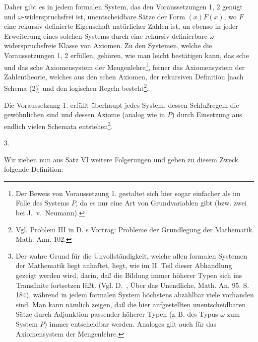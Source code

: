 \documentclass[draft]{scrartcl}
\begin{document}
Daher gibt es in jedem formalen System, das den Voraussetzungen 1, 2 genügt
und $\omega$-widerspruchsfrei ist, unentscheidbare Sätze der Form
$\left(x\right)F\left(x\right)$, wo $F$ eine rekursiv definierte Eigenschaft
natürlicher Zahlen ist, un ebenso in jeder Erweiterung eines solchen Systems
durch eine rekursiv definierbare $\omega$-widerspruchsfreie Klasse von Axiomen.
Zu den Systemen, welche die Voraussetzungen 1, 2 erfüllen, gehören, wie man leicht
bestätigen kann, das sche und das sche Axiomensystem
der Mengenlehre\footnote{Der Beweis von Voraussetzung 1. gestaltet sich hier sogar einfacher
als im Falle des Systems $P$, da es nur eine Art von Grundvariablen gibt (bzw. zwei bei J.~v.~Neumann).},
ferner das Axiomensystem der Zahlentheorie, welches aus
den schen Axiomen, der rekursiven Definition [nach Schema (2)]
und den logischen Regeln besteht\footnote{Vgl. Problem III in D. s Vortrag:
Probleme der Grundlegung der Mathematik. Math. Ann. 102.}.

\let\originalfootnote=\thefootnote
\let\thefootnote=\fnachtundvierziga
Die Voraussetzung 1. erfüllt überhaupt jedes System, dessen Schlußregeln die gewöhnlichen
sind und dessen Axiome (analog wie in $P$) durch Einsetzung aus endlich vielen Schemata
entstehen\footnote{Der wahre Grund für die
Unvollständigkeit, welche allen formalen Systemen
der Mathematik liegt anhaftet, liegt, wie im II.
Teil dieser Abhandlung gezeigt werden wird, darin,
daß die Bildung immer höherer Typen sich ins
Transfinite fortsetzen läßt. (Vgl. D.~,
Über das Unendliche, Math. An. 95. S. 184), während
in jedem formalen System höchstens abzählbar viele
vorhanden sind. Man kann nämlich zeigen, daß die hier
aufgestellten unentscheidbaren Sätze durch Adjunktion
passender höherer Typen (z.\,B. des Typus $\omega$ zum
System $P$) immer entscheidbar werden. Analoges gilt auch
für das Axiomensystem der Mengenlehre.}.
\let\thefootnote=\originalfootnote
\setcounter{footnote}{48}

\begin{center}
3.
\end{center}

Wir ziehen nun aus Satz VI weitere Folgerungen und geben zu diesem Zweck folgende Definition:
\end{document}
